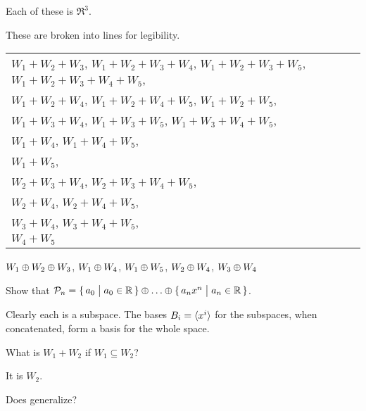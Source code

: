 \begin{exercises}
    \begin{answer}
     Each of these is $\Re^3$.
     \begin{exparts}
      \partsitem 
        These are broken into lines for legibility.
        \begin{center}
          \begin{tabular}[t]{l} 
            $W_1+W_2+W_3$, 
              $W_1+W_2+W_3+W_4$, 
              $W_1+W_2+W_3+W_5$, 
              $W_1+W_2+W_3+W_4+W_5$, \\ \quad %
              $W_1+W_2+W_4$, 
              $W_1+W_2+W_4+W_5$, 
              $W_1+W_2+W_5$,         \\
              $W_1+W_3+W_4$, 
              $W_1+W_3+W_5$, 
              $W_1+W_3+W_4+W_5$,     \\ 
              $W_1+W_4$, 
              $W_1+W_4+W_5$,         \\ 
              $W_1+W_5$,             \\ 
              $W_2+W_3+W_4$, 
              $W_2+W_3+W_4+W_5$,     \\
              $W_2+W_4$, 
              $W_2+W_4+W_5$,         \\ 
              $W_3+W_4$, 
              $W_3+W_4+W_5$,         \\ 
              $W_4+W_5$ 
          \end{tabular}
         \end{center}
     \partsitem
       $W_1\oplus W_2\oplus W_3$,    
       $W_1\oplus W_4$,    
       $W_1\oplus W_5$,    
       $W_2\oplus W_4$,    
       $W_3\oplus W_4$    
     \end{exparts}
    \end{answer}
  \recommended \item
    Show that \( \polyspace_n=\set{a_0 \suchthat a_0\in\Re}\directsum\dots
                              \directsum\set{a_nx^n\suchthat a_n\in\Re} \).
    \begin{answer}
      Clearly each is a subspace.
      The bases \( B_i=\langle x^i\rangle \) for the subspaces, when concatenated,
      form a basis for the whole space.  
    \end{answer}
  \item 
    What is \( W_1+W_2 \) if \( W_1\subseteq W_2 \)?
    \begin{answer}
       It is \( W_2 \).  
    \end{answer}
  \item 
    Does  generalize?

\end{exercises}
